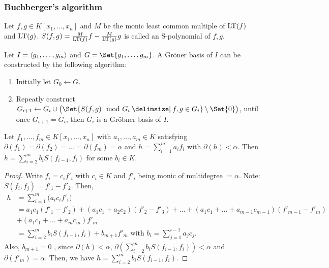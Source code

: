 \subsubsection{Buchberger's algorithm}

\begin{definition}
  Let $f,g \in K[x_1,\dots,x_n]$ and $M$ be the monic least common multiple of
  $\operatorname{LT}(f)$ and $\operatorname{LT}(g)$. $S(f,g) = \frac{M}{\operatorname{LT}(f)}f - \frac{M}{\operatorname{LT}(g)}g$ is
  called an S-polynomial of $f, g$.
\end{definition}

Let $I = \langle g_1, \dots, g_m \rangle$ and $G = \Set{ g_1, \dots, g_m }$.
A Gr\"{o}ner basis of $I$ can be constructed by the following algorithm:
\begin{enumerate}
  \item Initially let $G_0 \gets G$.
  \item Repeatly construct $G_{i+1} \gets G_i \cup \big(
    \Set{S(f, g) \mod G_i \given f, g \in G_i} \setminus \Set{0} \big)$,
    until once $G_{i+1} = G_i$, then $G_i$ is a Gr\"{o}bner basis of $I$.
\end{enumerate}

\begin{lemma} \label{lemma:sum-of-equal-degree-f-is-less}
  Let $f_1, \dots, f_m \in K[x_1, \dots, x_n]$ with $a_1, \dots, a_m \in K$
  satisfying $\partial(f_1) = \partial(f_2) = \dots = \partial(f_m) = \alpha$
  and $h =\sum_{i = 1}^m a_i f_i $ with $\partial(h) < \alpha$.
  Then $h = \sum_{i = 2}^m b_i S(f_{i-1}, f_i)$ for some $b_i \in K$.
  \begin{proof}
    Write $f_i = c_if'_i$ with $c_i \in K$ and $f'_i$ being monic of multidegree
    $= \alpha$. Note: $S(f_i, f_j) = f'_1 - f'_2$. Then, 
    \[
      \begin{split}
        h &= \sum_{i=1}^m \big( a_ic_if'_i \big) \\
        &= a_1c_1(f'_1-f'_2) + (a_1c_1+a_2c_2)(f'_2-f'_3) + \dots+ (a_1c_1 + \dots + a_{m-1}c_{m-1})(f'_{m-1}-f'_m) \\
        &+ (a_1c_1+\dots+a_mc_m)f'_m \\
        &= \sum\limits_{i=2}^m b_iS(f_{i-1},f_i) + b_{m+1}f'_m\text{ with }
        b_i = \sum_{j=1}^{i-1}a_jc_j.
      \end{split}
    \]
    Also, $b_{m+1} = 0$ , since $\partial(h) < \alpha$,
    $\partial\left(\sum\limits_{i=2}^m b_iS(f_{i-1},f_i) \right) < \alpha$ and
    $\partial(f'_m) = \alpha$. Then, we have $h = \sum_{i = 2}^m b_i S(f_{i-1}, f_i)$.
  \end{proof}
\end{lemma}

